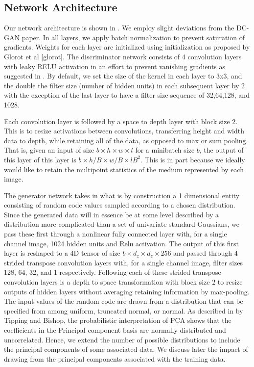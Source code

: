 \documentclass{article}
\begin{document}
\subsection{Network Architecture}\label{arch}
Our network architecture is shown in \label{nnet}.  We employ slight deviations from the DC-GAN paper.  In all layers, we apply batch normalization to prevent saturation of gradients. Weights for each layer are initialized using initialization as proposed by Glorot et al [glorot]. The discriminator network consists of 4 convolution layers with leaky RELU activation in an effort to prevent vanishing gradients as suggested in \cite{Radford2015UnsupervisedNetworks}. By default, we set the size of the kernel in each layer to 3x3, and the double the filter size (number of hidden units) in each subsequent layer by 2 with the exception of the last layer to have a filter size sequence of 32,64,128, and 1028.

	Each convolution layer is followed by a space to depth layer with block size 2.  This is to resize activations between convolutions, transferring height and width data to depth, while retaining all of the data, as opposed to max or sum pooling. That is, given an input of size $ b\times h\times w\times l$ for a minibatch size $b$, the output of this layer of this layer is $b\times h/B \times w/B \times l B^2$.  This is in part because we ideally would like to retain the multipoint statistics of the medium represented by each image.  

	The generator network takes in what is by construction a 1 dimensional entity consisting of random code values sampled according to a chosen distribution.  Since the generated data will in essence be at some level described by a distribution more complicated than a set of univariate standard Gaussians, we pass these first through a nonlinear fully connected layer with, for a single channel image, 1024 hidden units and Relu activation.  The output of this first layer is reshaped to a 4D tensor of size $b\times d_z \times d_z \times 256$ and passed through 4 strided transpose convolution layers with, for a single channel image, filter sizes 128, 64, 32, and 1 respectively.  Following each of these  strided transpose convolution layers is a depth to space transformation with block size $2$ to resize outputs of hidden layers without averaging retaining information by max-pooling.  The input values of the random code are drawn from a distribution that can be specified from among uniform, truncated normal, or normal.  As described in \cite{Tipping1999ProbabilisticAnalysis} by Tipping and Bishop, the probabilistic interpretation of PCA shows that the coefficients in the Principal component basis are normally distributed and uncorrelated.  Hence, we extend the number of possible distributions to include the principal components of some associated data.  We discuss later the impact of drawing from the principal components associated with the training data.
\end{document}
